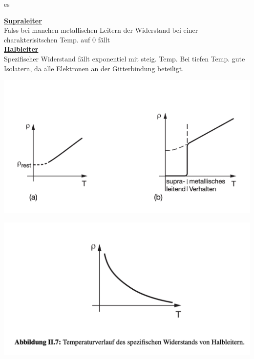 es\documentclass[a4paper, fontsize=8pt, landscape]{scrartcl}
\newcommand{\hl}[1]{\underline{\textbf{#1}}}
\begin{document}
\begin{multicols*}{4}
        \hl{Supraleiter}\\
            Falss bei manchen metallischen Leitern der Widerstand bei einer charakterisitschen Temp. auf 0 fällt\\
        
        \hl{Halbleiter}\\
            Spezifischer Widerstand fällt exponentiel mit steig. Temp. Bei tiefen Temp. gute Isolatern, da alle Elektronen an der Gitterbindung beteiligt. 
            
        \begin{center}
            \includegraphics[scale=0.2]{Images/Klassifizierung.png}
        \end{center}
        \begin{center}
            \includegraphics[scale=0.2]{Images/Tempverlauf von Halbleiter.png}
        \end{center}
    

\end{multicols*}
\end{document}
